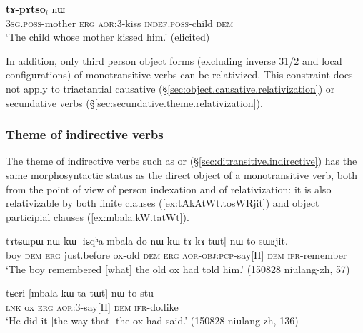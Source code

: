 \begin{exe}
\ex \label{ex:Wmu.kW.kanWpoR}
\gll [ɯ$_i$-mu kɯ ka-nɯpoʁ] \textbf{tɤ-pɤtso}$_i$ nɯ \\
\textsc{3sg}.\textsc{poss}-mother \textsc{erg} \textsc{aor}:3\flobv{}-kiss \textsc{indef}.\textsc{poss}-child \textsc{dem} \\
\glt `The child whose mother kissed him.' (elicited)
\end{exe}

In addition, only third person object forms (excluding inverse 3\fl{}1/2 and local configurations) of monotransitive verbs can be relativized. This constraint does not apply to triactantial causative (§\ref{sec:object.causative.relativization}) or secundative verbs (§\ref{sec:secundative.theme.relativization}).
\subsubsection{Theme of indirective verbs} \label{sec:indirective.relativization}
The theme of indirective verbs such as  or  (§\ref{sec:ditransitive.indirective}) has the same morphosyntactic status as the direct object of a monotransitive verb, both from the point of view of person indexation and of relativization: it is also relativizable by both finite clauses (\ref{ex:tAkAtWt.tosWRjit}) and object participial clauses (\ref{ex:mbala.kW.tatWt}).

\begin{exe}
\ex \label{ex:tAkAtWt.tosWRjit}
\gll tɤtɕɯpɯ nɯ kɯ [iɕqʰa mbala-do nɯ kɯ tɤ-kɤ-tɯt] nɯ to-sɯʁjit. \\
boy \textsc{dem} \textsc{erg} just.before ox-old \textsc{dem} \textsc{erg} \textsc{aor}-\textsc{obj}:\textsc{pcp}-say[II] \textsc{dem} \textsc{ifr}-remember \\
 \glt `The boy remembered [what] the old ox had told him.' (150828 niulang-zh, 57)
 \end{exe}
 
 \begin{exe}
\ex \label{ex:mbala.kW.tatWt}
\gll tɕeri [mbala kɯ ta-tɯt] nɯ to-stu \\
\textsc{lnk} ox \textsc{erg} \textsc{aor}:3\flobv{}-say[II] \textsc{dem} \textsc{ifr}-do.like \\
\glt `He did it [the way that] the ox had said.' (150828 niulang-zh, 136)
\end{exe} 

